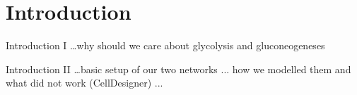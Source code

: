 \section{Introduction}
\begin{frame}{Introduction I}
\dots why should we care about glycolysis and gluconeogeneses
\end{frame}

\begin{frame}{Introduction II}
\dots basic setup of our two networks ... how we modelled them and what did not work (CellDesigner) ...
\end{frame}
